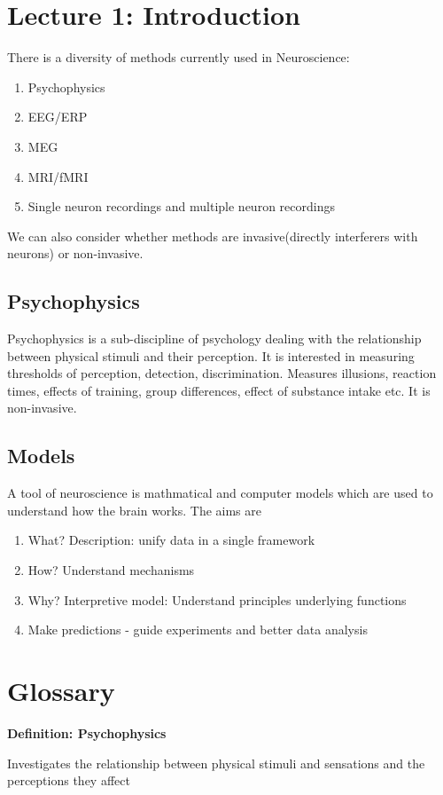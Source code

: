 \documentclass[11pt]{article}
\newcommand{\define}[2] {
  \textbf{Definition: #1}
  \begin{center} #2
\end{center}
}
\begin{document}
\section{Lecture 1: Introduction}

There is a diversity of methods currently used in Neuroscience:

\begin{enumerate}
\item Psychophysics
\item EEG/ERP
\item MEG
\item MRI/fMRI
\item Single neuron recordings and multiple neuron recordings
\end{enumerate}

We can also consider whether methods are invasive(directly interferers with neurons\cite{check}) or non-invasive. 

\subsection*{Psychophysics}
Psychophysics is a sub-discipline of psychology dealing with the relationship between physical stimuli and their perception. It is interested in measuring thresholds of perception, detection, discrimination. Measures illusions, reaction times, effects of training, group differences, effect of substance intake etc. It is non-invasive.  

\subsection*{Models}
A tool of neuroscience is mathmatical and computer models which are used to understand how the brain works. The aims are 

\begin{enumerate}
\item What? Description: unify data in a single framework
\item How? Understand mechanisms
\item Why? Interpretive model: Understand principles underlying functions
\item Make predictions - guide experiments and better data analysis
\end{enumerate}

\section{Glossary}
\define{Psychophysics}{Investigates the relationship between physical stimuli and sensations and the perceptions they affect}
\end{document}
